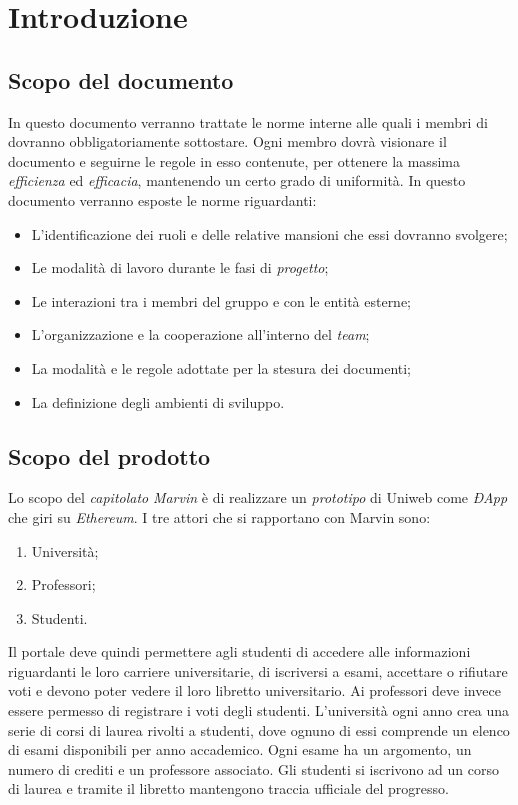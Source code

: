 \newpage
\section{Introduzione}

\subsection{Scopo del documento}
In questo documento verranno trattate le norme interne alle quali i membri di \gruppo{} dovranno obbligatoriamente sottostare. Ogni membro dovrà visionare il documento e seguirne le regole in esso contenute, per ottenere la massima \emph{efficienza} ed \emph{efficacia}, mantenendo un certo grado di uniformità.
\newline In questo documento verranno esposte le norme riguardanti:
\begin{itemize}
	\item L'identificazione dei ruoli e delle relative mansioni che essi dovranno svolgere;
	\item Le modalità di lavoro durante le fasi di \emph{progetto};
	\item Le interazioni tra i membri del gruppo e con le entità esterne;
	\item L'organizzazione e la cooperazione all'interno del \emph{team};
	\item La modalità e le regole adottate per la stesura dei documenti;
	\item La definizione degli ambienti di sviluppo.
\end{itemize}
\subsection{Scopo del prodotto}
Lo scopo del \emph{capitolato} \emph{Marvin} è di realizzare un \emph{prototipo} di Uniweb come \textit{ÐApp} che giri su \textit{Ethereum}. I tre attori che si rapportano con Marvin sono:
\begin{enumerate}
	\item Università;
	\item Professori;
	\item Studenti.
\end{enumerate}
Il portale deve quindi permettere agli studenti di accedere alle informazioni riguardanti le loro carriere universitarie, di iscriversi a esami, accettare o rifiutare voti e devono poter vedere il loro libretto universitario.
\newline Ai professori deve invece essere permesso di registrare i voti degli studenti.
\newline L'università ogni anno crea una serie di corsi di laurea rivolti a studenti, dove  ognuno di essi comprende un elenco di esami disponibili per anno accademico. Ogni esame ha un argomento, un numero di crediti e un professore associato.
\newline Gli studenti si iscrivono ad un corso di laurea e tramite il libretto mantengono traccia ufficiale del progresso.
